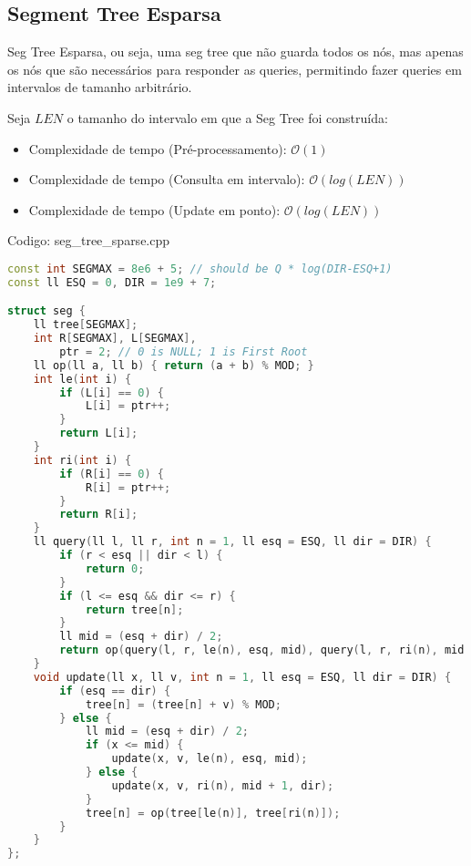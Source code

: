 \documentclass[10pt, a4paper, oneside]{book}
\begin{document}
\subsection{Segment Tree Esparsa}


Seg Tree Esparsa, ou seja, uma seg tree que não guarda todos os nós, mas apenas os nós que são necessários para responder as queries, permitindo fazer queries em intervalos de tamanho arbitrário.



Seja $LEN$ o tamanho do intervalo em que a Seg Tree foi construída:



\begin{itemize}
\item Complexidade de tempo (Pré-processamento): $\mathcal{O}(1)$
\item Complexidade de tempo (Consulta em intervalo): $\mathcal{O}(log(LEN))$
\item Complexidade de tempo (Update em ponto): $\mathcal{O}(log(LEN))$
\end{itemize}

\hfill

Codigo: seg\_tree\_sparse.cpp

\begin{lstlisting}[language=C++]
const int SEGMAX = 8e6 + 5; // should be Q * log(DIR-ESQ+1)
const ll ESQ = 0, DIR = 1e9 + 7;

struct seg {
    ll tree[SEGMAX];
    int R[SEGMAX], L[SEGMAX],
        ptr = 2; // 0 is NULL; 1 is First Root
    ll op(ll a, ll b) { return (a + b) % MOD; }
    int le(int i) {
        if (L[i] == 0) {
            L[i] = ptr++;
        }
        return L[i];
    }
    int ri(int i) {
        if (R[i] == 0) {
            R[i] = ptr++;
        }
        return R[i];
    }
    ll query(ll l, ll r, int n = 1, ll esq = ESQ, ll dir = DIR) {
        if (r < esq || dir < l) {
            return 0;
        }
        if (l <= esq && dir <= r) {
            return tree[n];
        }
        ll mid = (esq + dir) / 2;
        return op(query(l, r, le(n), esq, mid), query(l, r, ri(n), mid + 1, dir));
    }
    void update(ll x, ll v, int n = 1, ll esq = ESQ, ll dir = DIR) {
        if (esq == dir) {
            tree[n] = (tree[n] + v) % MOD;
        } else {
            ll mid = (esq + dir) / 2;
            if (x <= mid) {
                update(x, v, le(n), esq, mid);
            } else {
                update(x, v, ri(n), mid + 1, dir);
            }
            tree[n] = op(tree[le(n)], tree[ri(n)]);
        }
    }
};
\end{lstlisting}
\hfill
\end{document}
